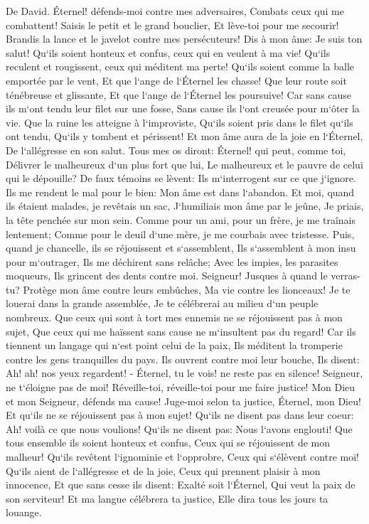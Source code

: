 \verse De David. Éternel! défends-moi contre mes adversaires, Combats ceux qui me combattent! 
\verse Saisis le petit et le grand bouclier, Et lève-toi pour me secourir! 
\verse Brandis la lance et le javelot contre mes persécuteurs! Dis à mon âme: Je suis ton salut! 
\verse Qu`ils soient honteux et confus, ceux qui en veulent à ma vie! Qu`ils reculent et rougissent, ceux qui méditent ma perte! 
\verse Qu`ils soient comme la balle emportée par le vent, Et que l`ange de l`Éternel les chasse! 
\verse Que leur route soit ténébreuse et glissante, Et que l`ange de l`Éternel les poursuive! 
\verse Car sans cause ils m`ont tendu leur filet sur une fosse, Sans cause ils l`ont creusée pour m`ôter la vie. 
\verse Que la ruine les atteigne à l`improviste, Qu`ils soient pris dans le filet qu`ils ont tendu, Qu`ils y tombent et périssent! 
\verse Et mon âme aura de la joie en l`Éternel, De l`allégresse en son salut. 
\verse Tous mes os diront: Éternel! qui peut, comme toi, Délivrer le malheureux d`un plus fort que lui, Le malheureux et le pauvre de celui qui le dépouille? 
\verse De faux témoins se lèvent: Ils m`interrogent sur ce que j`ignore. 
\verse Ils me rendent le mal pour le bien: Mon âme est dans l`abandon. 
\verse Et moi, quand ils étaient malades, je revêtais un sac, J`humiliais mon âme par le jeûne, Je priais, la tête penchée sur mon sein. 
\verse Comme pour un ami, pour un frère, je me traînais lentement; Comme pour le deuil d`une mère, je me courbais avec tristesse. 
\verse Puis, quand je chancelle, ils se réjouissent et s`assemblent, Ils s`assemblent à mon insu pour m`outrager, Ils me déchirent sans relâche; 
\verse Avec les impies, les parasites moqueurs, Ils grincent des dents contre moi. 
\verse Seigneur! Jusques à quand le verras-tu? Protège mon âme contre leurs embûches, Ma vie contre les lionceaux! 
\verse Je te louerai dans la grande assemblée, Je te célébrerai au milieu d`un peuple nombreux. 
\verse Que ceux qui sont à tort mes ennemis ne se réjouissent pas à mon sujet, Que ceux qui me haïssent sans cause ne m`insultent pas du regard! 
\verse Car ils tiennent un langage qui n`est point celui de la paix, Ils méditent la tromperie contre les gens tranquilles du pays. 
\verse Ils ouvrent contre moi leur bouche, Ils disent: Ah! ah! nos yeux regardent! - 
\verse Éternel, tu le vois! ne reste pas en silence! Seigneur, ne t`éloigne pas de moi! 
\verse Réveille-toi, réveille-toi pour me faire justice! Mon Dieu et mon Seigneur, défends ma cause! 
\verse Juge-moi selon ta justice, Éternel, mon Dieu! Et qu`ils ne se réjouissent pas à mon sujet! 
\verse Qu`ils ne disent pas dans leur coeur: Ah! voilà ce que nous voulions! Qu`ils ne disent pas: Nous l`avons englouti! 
\verse Que tous ensemble ils soient honteux et confus, Ceux qui se réjouissent de mon malheur! Qu`ils revêtent l`ignominie et l`opprobre, Ceux qui s`élèvent contre moi! 
\verse Qu`ils aient de l`allégresse et de la joie, Ceux qui prennent plaisir à mon innocence, Et que sans cesse ils disent: Exalté soit l`Éternel, Qui veut la paix de son serviteur! 
\verse Et ma langue célébrera ta justice, Elle dira tous les jours ta louange. 

